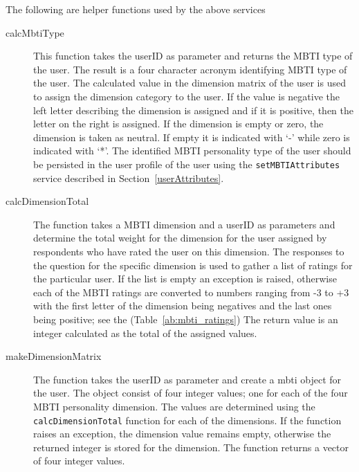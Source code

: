 The following are helper functions used by the above services
\begin{description}

\item[calcMbtiType] This function takes the userID as parameter and returns the MBTI type of the user. The result is a four character acronym identifying MBTI type of the user. The calculated value in the dimension matrix of the user is used to assign the dimension category to the user. If the value is negative the left letter describing the dimension is assigned and if it is positive, then the letter on the right is assigned. If the dimension is empty or zero, the dimension is taken as neutral. If empty it is indicated with `-' while zero is indicated with `*'.  The identified MBTI personality type of the user should be persisted in the user profile of the user using the \texttt{setMBTIAttributes} service described in Section~\ref{userAttributes}.

\item[calcDimensionTotal] The function takes a MBTI dimension and a userID as parameters and determine the total weight for the dimension for the user assigned by respondents who have rated the user on this dimension. The responses to the question for the specific dimension is used to gather a list of ratings for the particular user. If the list is empty an exception is raised, otherwise each of the MBTI ratings are converted to numbers ranging from -3 to +3 with the first letter of the dimension being negatives and the last ones being positive; see the (Table~\ref{ab:mbti_ratings})  The return value is an integer calculated as the total of the assigned values.

\item[makeDimensionMatrix] The function takes the userID as parameter and create a mbti object for the user. The object consist of four integer values; one for each of the four MBTI personality dimension. The values are determined using the \texttt{calcDimensionTotal} function for each of the dimensions. If the function raises an exception, the dimension value remains empty, otherwise the returned integer is stored for the dimension. The function returns a vector of four integer values.


\end{description}  


